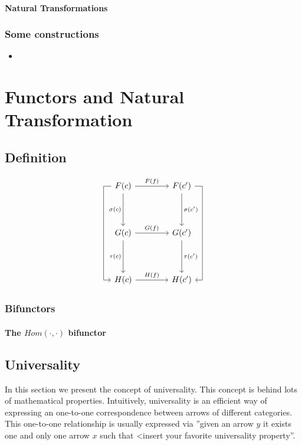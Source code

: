 \subsubsection{Natural Transformations}


\subsection{Some constructions}
\begin{itemize}
\item
\end{itemize}


\chapter{Functors and Natural Transformation}
\section{Definition}
$$
\begin{tikzcd}[row sep = 1.4cm, column sep = 1.4cm]
  F(c)
  \arrow[lddr, to path= { --
    ([xshift=-1ex]\tikztostart.west)
    -| ([xshift=-2ex]\tikztotarget.west)
    |- (\tikztotarget)}]
  \arrow[d, swap, "\sigma(c)"]
  \arrow[r, "F(f)"] 
  & F(c')
  \arrow[d, "\sigma(c')"]
  \arrow[rddl, to path= { --
    ([xshift=1ex]\tikztostart.east) 
    -| ([xshift=2ex]\tikztotarget.east)
    -- (\tikztotarget)}, "\sigma \circ \tau(c')"]
  \\
  G(c)
  \arrow[d, swap, "\tau(c)"] 
  \arrow[r, "G(f)"] & G(c')
  \arrow[d, "\tau(c')"] \\
  H(c) 
  \arrow[r, "H(f)"] & H(c')
\end{tikzcd}
$$
\subsection{Bifunctors}
\subsubsection{The $Hom(\cdot,\cdot)$ bifunctor}
\section{Universality}
In this section we present the concept of universality. This concept is behind lots of mathematical properties. Intuitively, universality is an efficient way of expressing an one-to-one correspondence between arrows of different categories. This one-to-one relationship is usually expressed via ''given an arrow  $y$ it exists one and only one  arrow $x$ such that <insert your favorite universality property''.\\

